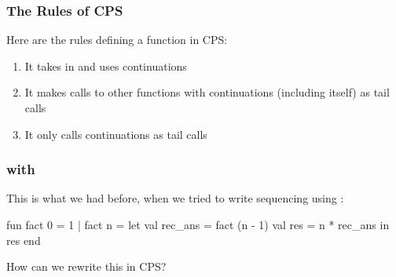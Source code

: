 \documentclass[aspectratio=169]{beamer}
\begin{document}
\begin{frame}[fragile]
  \frametitle{The Rules of CPS}

  Here are the rules defining a function in CPS:

  \pause
  \vspace{\fill}


  \pause
  \vspace{5pt}

  \begin{enumerate}
    \item It takes in and uses continuations \pause
    \item It makes calls to other functions with continuations (including itself)
    as tail calls \pause
    \item It only calls continuations as tail calls
  \end{enumerate}

  \pause
  \vspace{\fill}

\end{frame}





\begin{frame}[fragile]
  \frametitle{ with }

  This is what we had before, when we tried to write sequencing using :

  \pause
  \vspace{\fill}

  \begin{codeblock}
    fun fact 0 = 1
      | fact n =
        let
          val rec_ans = fact (n - 1)
          val res = n * rec_ans
        in
          res
        end
  \end{codeblock}

  \pause
  \vspace{\fill}

  How can we rewrite this in CPS?
\end{frame}
\end{document}
